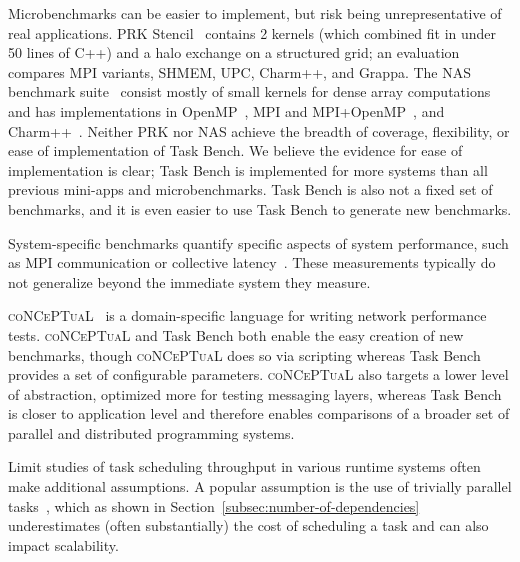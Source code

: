Microbenchmarks can be easier to implement, but risk being
unrepresentative of real applications. PRK Stencil~\cite{PRK14}
contains 2 kernels (which combined fit in under 50 lines of C++)
and a halo exchange on a structured grid; an
evaluation~\cite{PRKRuntimes16} compares MPI variants, SHMEM, UPC,
Charm++, and Grappa. The NAS benchmark suite~\cite{NAS91, NAS95}
consist mostly of small kernels for dense array computations and has
implementations in OpenMP~\cite{NASOpenMP99}, MPI and
MPI+OpenMP~\cite{NASMPIOpenMP00}, and
Charm++~\cite{NASCharm96}. Neither PRK nor NAS achieve the breadth of
coverage, flexibility, or ease of implementation of Task Bench. We
believe the evidence for ease of implementation is clear; Task Bench
is implemented for more systems than all previous mini-apps and
microbenchmarks. Task Bench is also not a fixed set of benchmarks, and
it is even easier to use Task Bench to generate new benchmarks.

System-specific benchmarks quantify specific aspects
of system performance, such as MPI communication or collective
latency~\cite{MPPTest99, MPIBench01}. These measurements typically do
not generalize beyond the immediate system they measure.

\textsc{coNCePTuaL}~\cite{Conceptual07} is a domain-specific language
for writing network performance tests. \textsc{coNCePTuaL} and Task
Bench both enable the easy creation of new benchmarks, though
\textsc{coNCePTuaL} does so via scripting whereas Task Bench provides
a set of configurable parameters. \textsc{coNCePTuaL} also targets a
lower level of abstraction, optimized more for testing messaging
layers, whereas Task Bench is closer to application level and
therefore enables comparisons of a broader set of parallel and
distributed programming systems.

Limit studies of task scheduling throughput in various runtime systems
often make additional assumptions. A popular assumption is the use of
trivially parallel tasks~\cite{Canary16, Armstrong14}, which as shown
in Section~\ref{subsec:number-of-dependencies} underestimates (often
substantially) the cost of scheduling a task and can also impact scalability.
